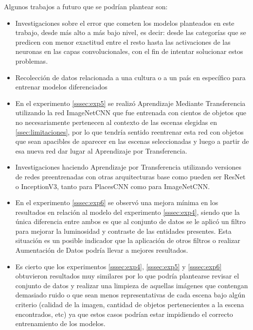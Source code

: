 Algunos trabajos a futuro que se podrían plantear son: 
\begin{itemize}
	\item Investigaciones sobre el error que cometen los modelos planteados en este trabajo, desde más alto a más bajo nivel, es decir: desde las categorías que se predicen con menor exactitud entre el resto hasta las activaciones de las neuronas en las capas convolucionales, con el fin de intentar solucionar estos problemas.
	\item Recolección de datos relacionada a una cultura o a un país en	específico para entrenar modelos diferenciados
	\item En el experimento \ref{sssec:exp5} se realizó Aprendizaje Mediante Transferencia utilizando la red ImageNetCNN que fue entrenada con cientos de objetos que no necesariamente pertenecen al contexto de las escenas elegidas en \ref{ssec:limitaciones}, por lo que tendría sentido reentrenar esta red con objetos que sean apacibles de aparecer en las escenas seleccionadas y luego a partir de esa nueva red dar lugar al Aprendizaje por Transferencia.
	\item Investigaciones haciendo Aprendizaje por Transferencia utilizando versiones de redes preentrenadas con otras arquitecturas base como pueden ser ResNet o InceptionV3, tanto para PlacesCNN como para ImageNetCNN.
	\item En el experimento \ref{sssec:exp6} se observó una mejora mínima en los resultados en relación al modelo del experimento \ref{sssec:exp4}, siendo que la única diferencia entre ambos es que al conjunto de datos se le aplicó un filtro para mejorar la luminosidad y contraste de las entidades presentes. Esta situación es un posible indicador que la aplicación de otros filtros o realizar Aumentación de Datos podría llevar a mejores resultados.
	\item Es cierto que los experimentos \ref{sssec:exp4}, \ref{sssec:exp5} y \ref{sssec:exp6} obtuvieron resultados muy similares por lo que podría plantearse revisar el conjunto de datos y realizar una limpieza de aquellas imágenes que contengan demasiado ruido o que sean menos representativas de cada escena bajo algún criterio (calidad de la imagen, cantidad de objetos pertenecientes a la escena encontrados, etc) ya que estos casos podrían estar impidiendo el correcto entrenamiento de los modelos.
\end{itemize}
